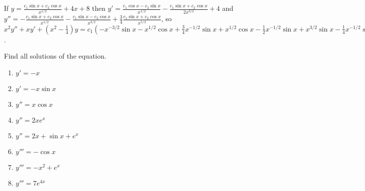 \documentclass{ximera}
\begin{document}
\begin{problem}
\begin{enumerate}
\begin{solution}
    If $y=\frac{c_1\sin x+c_2 \cos x}{x^{1/2}}+4x+8$
then
 $y'=\frac{c_1\cos x-c_2 \sin x}{x^{1/2}}
-\frac{c_1\sin x+c_2 \cos x}{2x^{3/2}}+4$ and
$y''=-\frac{c_1\sin x+c_2 \cos x}{x^{1/2}}
-\frac{c_1\sin x-c_2 \cos x}{x^{3/2}}+\frac{3}{4}
\frac{c_1\sin x+c_2 \cos x}{x^{5/2}}$, so
$ x^2y''+xy'+\left(x^2-\frac{1}{4}\right)y=
c_1\left(-x^{-3/2}\sin x-x^{1/2}\cos x+
\frac{3}{4}x^{-1/2}\sin x +x^{1/2}\cos x-
\frac{1}{2}x^{-1/2}\sin x+x^{3/2}\sin
x-\frac{1}{4}x^{-1/2}
\sin x\right)+
 c_2\left(-x^{-3/2}\cos x+x^{1/2}\sin x
+\frac{3}{4}x^{-1/2}\cos x-x^{1/2}\sin x-\frac{1}{2}x^{-1/2}\cos x+
 x^{3/2}\cos x-\frac{1}{4}x^{-1/2}\cos x\right)+4x+\left(x^2-\frac{1}{4}\right)
(4x+8)=4x^3+8x^2+3x-2$.
\end{solution}
\end{enumerate}
\end{problem}

\begin{problem}\label{exer:1.2.3}
Find all solutions of the  equation.

\begin{enumerate}
\item $y'=-x$
\item $y'=-x \sin x$
\item $y''=x \cos x$
\item $y''=2xe^x$
\item $y''=2x+\sin x+e^x$
\item $y'''=-\cos x$
\item $y'''=-x^2+e^x$
\item $y'''=7e^{4x}$
\end{enumerate}
\end{problem}
\end{document}
